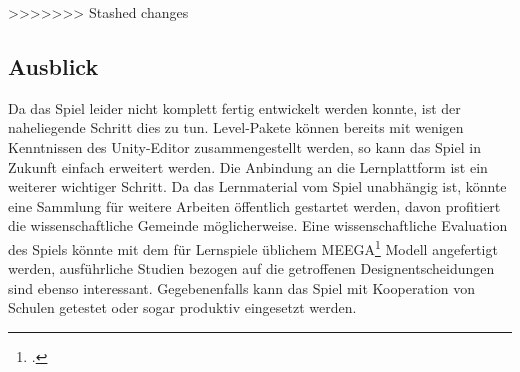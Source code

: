 >>>>>>> Stashed changes
\subsection{Ausblick}
	Da das Spiel leider nicht komplett fertig entwickelt werden konnte, ist der naheliegende Schritt dies zu tun. Level-Pakete können bereits mit wenigen Kenntnissen des Unity-Editor zusammengestellt werden, so kann das Spiel in Zukunft einfach erweitert werden. Die Anbindung an die Lernplattform ist ein weiterer wichtiger Schritt.
	Da das Lernmaterial vom Spiel unabhängig ist, könnte eine Sammlung für weitere Arbeiten öffentlich gestartet werden, davon profitiert die wissenschaftliche Gemeinde möglicherweise.
	Eine wissenschaftliche Evaluation des Spiels könnte mit dem für Lernspiele üblichem MEEGA\footcite{psych1} Modell angefertigt werden, ausführliche Studien bezogen auf die getroffenen Designentscheidungen sind ebenso interessant.
	Gegebenenfalls kann das Spiel mit Kooperation von Schulen getestet oder sogar produktiv eingesetzt werden.
